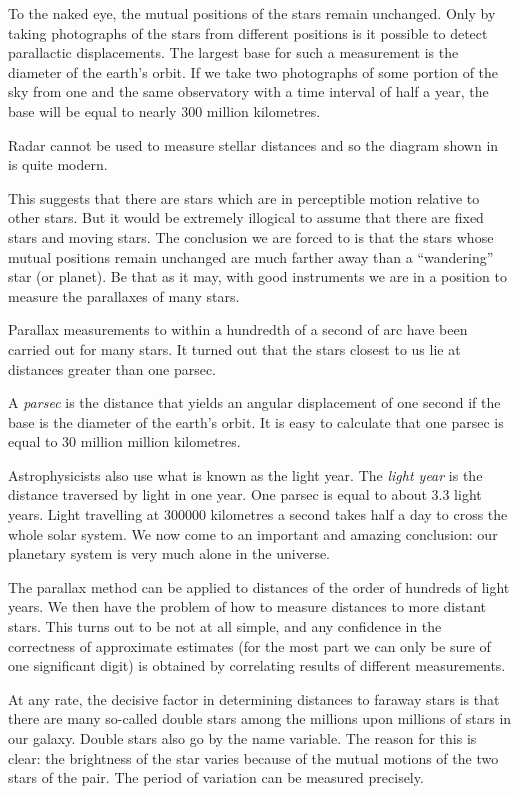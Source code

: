To the naked eye, the mutual positions of the stars remain unchanged. Only by taking photographs of the stars from different positions is it possible to detect parallactic displacements. The largest base for such a mea­surement is the diameter of the earth’s orbit. If we take two photographs of some portion of the sky from one and the same observatory with a time interval of half a year, the base will be equal to nearly 300 million kilometres.

Radar cannot be used to measure stellar distances and so the diagram shown in  is quite modern. 

This suggests that there are stars which are in perceptible motion relative to other stars. But it would be extremely illogical to assume that there are fixed stars and moving stars. The conclusion we are forced to is that the stars whose mutual positions remain unchanged are much farther away than a ``wandering'' star (or planet). Be that as it may, with good instruments we are in a position to measure the parallaxes of many stars.

Parallax measurements to within a hundredth of a second of arc have been carried out for many stars. It turned out that the stars closest to us lie at distances greater than one parsec.

A \emph{parsec} is the distance that yields an angular displacement of one second if the base is the diameter of the earth’s orbit. It is easy to calculate that one parsec is equal to 30 million million kilometres.

Astrophysicists also use what is known as the light year. The \emph{light year} is the distance traversed by light in one year. One parsec is equal to about 3.3 light years. Light travelling at \num{300000} kilometres a second takes half a day to cross the whole solar system. We now come to an important and amazing conclusion: our planetary system is very much alone in the universe.

The parallax method can be applied to distances of the order of hundreds of light years. We then have the prob­lem of how to measure distances to more distant stars. This turns out to be not at all simple, and any confidence in the correctness of approximate estimates (for the most part we can only be sure of one significant digit) is ob­tained by correlating results of different measurements.

At any rate, the decisive factor in determining dis­tances to faraway stars is that there are many so-called double stars among the millions upon millions of stars in our galaxy. Double stars also go by the name variable. The reason for this is clear: the brightness of the star varies because of the mutual motions of the two stars of the pair. The period of variation can be measured precise­ly.

